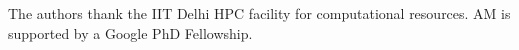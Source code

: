 \documentclass[sigconf]{acmart}
\begin{document}
\fancyhead{}








\begin{acks}
The authors thank the IIT Delhi HPC facility for computational resources. AM is supported by a Google PhD Fellowship.
\end{acks}




\clearpage
\appendix


\end{document}

